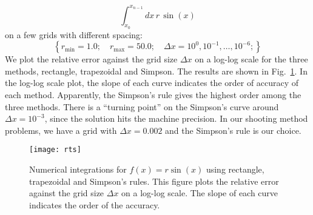 \begin{equation} \label{eq:sampInt}
\int_{x_0}^{x_{n-1}} dx\,r\,\sin{(x)}
\end{equation}
on a few grids with different spacing:
\begin{equation} \label{eq:sampIntGrid}
\left\{ r_{\text{min}} = 1.0;\quad r_{\text{max}} = 50.0;\quad \Delta x = 10^0,10^{-1},\ldots,10^{-6}; \right\}
\end{equation}
%
We plot the relative error against the grid size $\Delta x$
on a log-log scale for the three methods, rectangle, trapezoidal
and Simpson. The results are shown in Fig.~\ref{fig:rts}.
In the log-log scale plot, the slope of each curve indicates the order
of accuracy of each method. Apparently, the Simpson's rule gives
the highest order among the three methods. There is a ``turning point''
on the Simpson's curve around $\Delta x = 10^{-3}$, since the solution hits
the machine precision. In our shooting method problems, we have a grid
with $\Delta x = 0.002$ and the Simpson's rule is our choice.

\begin{figure}[h!]
\centering
  \texttt{[image: rts]}
  \caption{Numerical integrations for $f(x)=r\sin{(x)}$ using
  rectangle, trapezoidal and Simpson's rules. This figure plots the relative
  error against the grid size $\Delta x$ on a log-log scale. 
  The slope of each curve indicates the order of the accuracy.}
  \label{fig:rts}
\end{figure}

